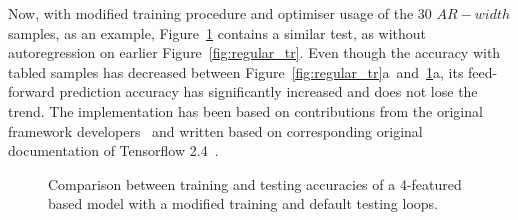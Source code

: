 %
%
Now, with modified training procedure and optimiser usage of the 30 $AR-width$ samples, as an example, \mbox{Figure~\ref{fig:modefied_tr}} contains a similar test, as without autoregression on earlier Figure~\ref{fig:regular_tr}.
Even though the accuracy with tabled samples has decreased between \mbox{Figure~\ref{fig:regular_tr}a and~\ref{fig:modefied_tr}a}, its feed-forward prediction accuracy has significantly increased and does not lose the trend.
The implementation has been based on contributions from the original framework developers~\cite{time_2020} and written based on corresponding original documentation of Tensorflow 2.4~\cite{tensorflow2015-whitepaper}.
 {
\begin{figure}[!t]
    \centering
    \label{subfig:modefied_tr}
    \label{subfig:modefied_ts}
    \caption{Comparison between training and testing accuracies of a 4-featured based model with a modified training and default testing loops.}
    \label{fig:modefied_tr}
\end{figure}
}
